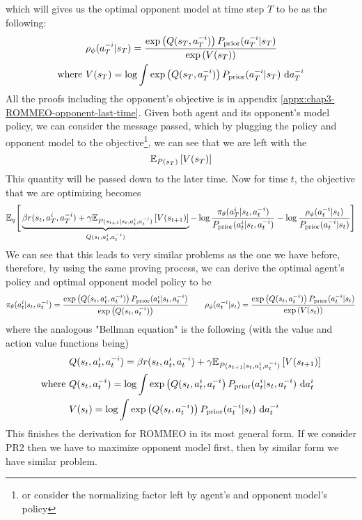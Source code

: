 which will gives us the optimal opponent model at time step $T$ to be as the following:
\begin{equation}
\begin{aligned}
    &\rho_{\phi}(a^{-i}_T | s_T)  = \frac{ \exp\left( Q(s_T, a^{-i}_T) \right)P_{\text{prior}}(a^{-i}_T | s_T) }{\exp\left( V(s_T) \right)}  \\
    \text{where }& V(s_T) = \log \int \exp\left( Q(s_T, a^{-i}_T) \right)P_{\text{prior}}(a^{-i}_T | s_T) \ \mathrm{d} a^{-i}_T
\end{aligned}
\end{equation}
All the proofs including the opponent's objective is in appendix \ref{appx:chap3-ROMMEO-opponent-last-time}. Given both agent and its opponent's model policy, we can consider the message passed, which by plugging the policy and opponent model to the objective\footnote{or consider the normalizing factor left by agent's and opponent model's policy}, we can see that we are left with the 
\begin{equation}
    \mathbb{E}_{P(s_T)}\left[ V(s_T) \right]
\end{equation}
This quantity will be passed down to the later time. Now for time $t$, the objective that we are optimizing becomes 
\begin{equation}
    \mathbb{E}_{q} \Bigg[ \underbrace{\beta r(s_t, a^i_T, a^{-i}_T) + \gamma \mathbb{E}_{P(s_{t+1} | s_t, a^i_t, a^{-i}_t)}  \left[ V(s_{t+1}) \right]}_{Q(s_t, a^i_t, a^{-i}_t)}  - \log \frac{\pi_{\theta}(a^i_T | s_t, a^{-i}_t)}{P_{\text{prior}}(a^i_t | s_t, a^{-i}_t) } - \log \frac{\rho_{\phi}(a^{-i}_t | s_t)}{P_{\text{prior}}(a^{-i}_t | s_t)} \Bigg]
\end{equation}
We can see that this leads to very similar problems as the one we have before, therefore, by using the same proving process, we can derive the optimal agent's policy and  optimal opponent model policy to be 
\begin{equation}
\begin{aligned}
    \label{eqn:chap3-final-ROMMEO-policy}
    \pi_{\theta}(a^i_t | s_t, a^{-i}_t) = \frac{\exp \left( Q(s_t, a^i_t, a^{-i}_t) \right)P_{\text{prior}}(a^i_t | s_t, a^{-i}_t) }{\exp\left( Q(s_t, a^{-i}_t) \right)} \quad \quad \rho_{\phi}(a^{-i}_t | s_t) = \frac{ \exp\left( Q(s_t, a^{-i}_t) \right)P_{\text{prior}}(a^{-i}_t | s_t) }{\exp\left( V(s_t) \right)}
\end{aligned}
\end{equation}
where the analogous "Bellman equation" is the following (with the value and action value functions being)
\begin{equation}
    \label{eqn:chap3-final-ROMMEO}
    \begin{aligned}
        &Q(s_t, a^i_t, a^{-i}_t) = \beta r(s_t, a^i_t, a^{-i}_t) + \gamma\mathbb{E}_{P(s_{t+1} | s_t, a^i_t, a^{-i}_t)} \left[ V(s_{t+1}) \right] \\
        \text{where }&Q(s_t, a^{-i}_t) = \log \int \exp \left( Q(s_t, a^i_t, a^{-i}_t \right)P_{\text{prior}}(a^i_t | s_t, a^{-i}_t)  \ \mathrm{d} a^i_t \\ 
        &V(s_t) = \log \int \exp\left( Q(s_t, a^{-i}_t) \right)P_{\text{prior}}(a^{-i}_t | s_t) \ \mathrm{d} a^{-i}_t \\
    \end{aligned}
\end{equation}    
This finishes the derivation for ROMMEO in its most general form. If we consider PR2 then we have to maximize opponent model first, then by similar form we have similar problem.

